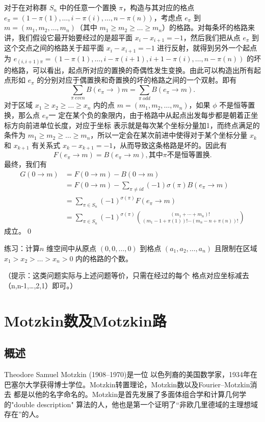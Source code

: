 对于在对称群 $S_n$ 中的任意一个置换 $\pi$，构造与其对应的格点
$e_{\pi}=(1-\pi(1),\ldots,i-\pi(i),\ldots,n-\pi(n))$，考虑点
$e_{\pi}$ 到 $m=(m_1,m_2,\ldots,m_n)$（其中 $m_1\geq
m_2\geq\ldots\geq
m_n$）的格路。对每条坏的格路来讲，我们假设它最开始要经过的是超平面
$x_i-x_{i+1}=-1$，然后我们把从点 $e_\pi$
到这个交点之间的格路关于超平面 $x_i-x_{i+1}=-1$
进行反射，就得到另外一个起点为
$e_{(i,i+1)\pi}=(1-\pi(1),\ldots,i-\pi(i+1),i+1-\pi(i),\ldots,n-\pi(n))$
的坏的格路，可以看出，起点所对应的置换的奇偶性发生变换。由此可以构造出所有起点形如
$e_\pi$ 的分别对应于偶置换和奇置换的坏的格路之间的一个双射。即有
$$\sum_{\pi\ even}B(e_{\pi}\rightarrow) m=\sum_{\pi\ odd}B(e_{\pi}\rightarrow m).$$
对于区域 $x_1\geq x_2\geq \ldots\geq x_n$ 内的点
$m=(m_1,m_2,\ldots,m_n)$，如果 $\phi$ 不是恒等置换，那么点
$e_{\pi}$一
定在某个负的象限内，由于格路中从起点出发每步都是朝着正坐标方向前进单位长度，对应于坐标
表示就是每次某个坐标分量加1，而终点满足的条件为 $m_1\geq m_2\geq
\ldots\geq m_n$，所以一定会在某次前进中使得对于某个坐标分量 $x_k$ 和
$x_{k+1}$ 有关系式 $x_k-x_{k+1}=-1$，从而导致这条格路是坏的。因此有
$$F(e_{\pi}\rightarrow m)=B(e_{\pi}\rightarrow m), \mbox{其中$\pi$不是恒等置换}.$$
最终，我们有
\begin{align*}
G(0\rightarrow m)&=F(0\rightarrow m)-B(0\rightarrow
m)\\
&=F(0\rightarrow m)-\sum_{\pi\neq
id}(-1)\sigma(\pi)B(e_{\pi}\rightarrow m)\\
&=\sum_{\pi\in S_n}(-1)^{\sigma(\pi)}F(e_{\pi}\rightarrow
m)\\
&=\sum_{\pi\in S_n}(-1)^{\sigma(\pi)}{{(m_1+\cdots+m_n)!}\choose
{(m_1-1+\pi(1))!\cdots(m_n-n+\pi(n))!}}
\end{align*}
成立。\qed

练习：计算$n$ 维空间中从原点 $(0,0,\ldots,0)$ 到格点
$(a_1,a_2,\ldots,a_n)$ 且限制在区域 $x_1> x_2>\ldots>x_n>0$
内的格路的个数。

（提示：这类问题实际与上述问题等价，只需在经过的每个
格点对应坐标减去（n,n-1,\ldots,2,1）即可。）

\section{Motzkin数及Motzkin路}
\subsection{概述}
Theodore Samuel Motzkin (1908–1970)是一位 以色列裔的美国数学家，1934年在巴塞尔大学获得博士学位。Motzkin转置理论，Motzkin数以及Fourier–Motzkin消去 都是以他的名字命名的。Motzkin是首先发展了多面体组合学和计算几何学的"double description" 算法的人，他也是第一个证明了“非欧几里德域的主理想域存在”的人。

